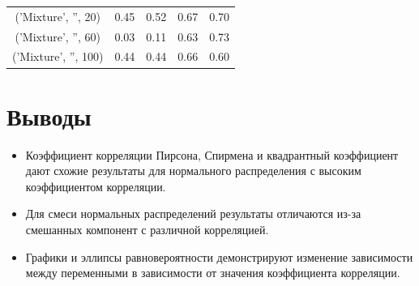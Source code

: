 \documentclass[a4paper]{article}
\begin{document}
\begin{table}[!htbp]
{\begin{tabular}{|c|c|c|c|c|}
                ('Mixture', '', 20)                                & 0.45                            & 0.52             & 0.67              & 0.70 \\
                ('Mixture', '', 60)                                & 0.03                            & 0.11             & 0.63              & 0.73 \\
                ('Mixture', '', 100)                               & 0.44                            & 0.44             & 0.66              & 0.60                 \\
                \hline
            \end{tabular}
        }
    \end{table}


    \section{Выводы}\label{sec:conclusions}
    \begin{itemize}
        \item Коэффициент корреляции Пирсона, Спирмена и квадрантный коэффициент дают схожие результаты для нормального распределения с высоким коэффициентом корреляции.
        \item Для смеси нормальных распределений результаты отличаются из-за смешанных компонент с различной корреляцией.
        \item Графики и эллипсы равновероятности демонстрируют изменение зависимости между переменными в зависимости от значения коэффициента корреляции.
    \end{itemize}
\end{document}
